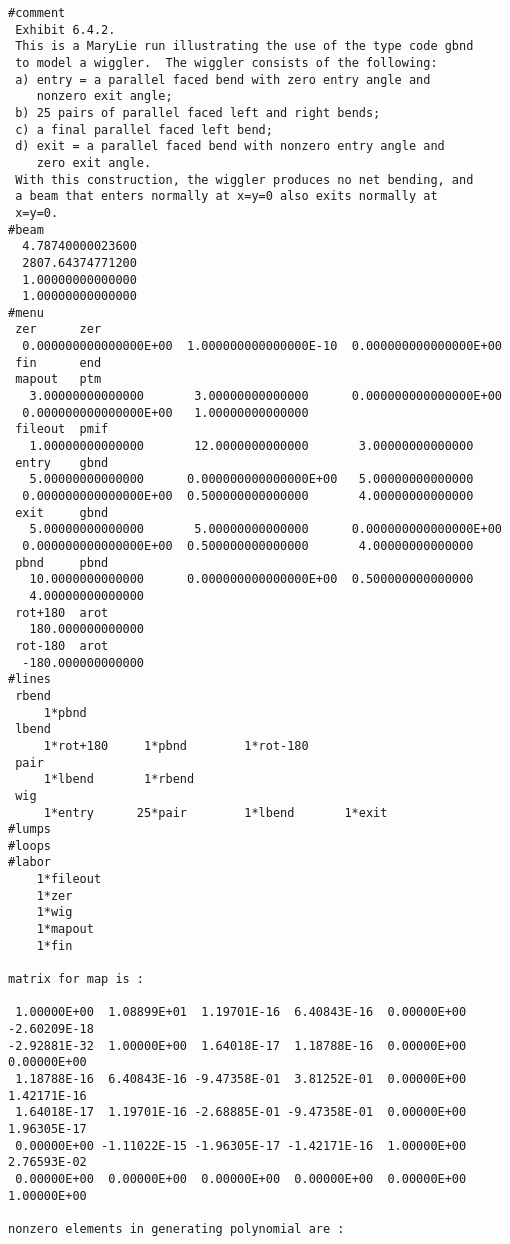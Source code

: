 \vspace{.25in}
\begin{footnotesize}
\begin{verbatim}
#comment
 Exhibit 6.4.2.
 This is a MaryLie run illustrating the use of the type code gbnd
 to model a wiggler.  The wiggler consists of the following:
 a) entry = a parallel faced bend with zero entry angle and
    nonzero exit angle;
 b) 25 pairs of parallel faced left and right bends;
 c) a final parallel faced left bend;
 d) exit = a parallel faced bend with nonzero entry angle and
    zero exit angle.
 With this construction, the wiggler produces no net bending, and
 a beam that enters normally at x=y=0 also exits normally at
 x=y=0.
#beam
  4.78740000023600
  2807.64374771200
  1.00000000000000
  1.00000000000000
#menu
 zer      zer
  0.000000000000000E+00  1.000000000000000E-10  0.000000000000000E+00
 fin      end
 mapout   ptm
   3.00000000000000       3.00000000000000      0.000000000000000E+00
  0.000000000000000E+00   1.00000000000000
 fileout  pmif
   1.00000000000000       12.0000000000000       3.00000000000000
 entry    gbnd
   5.00000000000000      0.000000000000000E+00   5.00000000000000
  0.000000000000000E+00  0.500000000000000       4.00000000000000
 exit     gbnd
   5.00000000000000       5.00000000000000      0.000000000000000E+00
  0.000000000000000E+00  0.500000000000000       4.00000000000000
 pbnd     pbnd
   10.0000000000000      0.000000000000000E+00  0.500000000000000
   4.00000000000000
 rot+180  arot
   180.000000000000
 rot-180  arot
  -180.000000000000
#lines
 rbend
     1*pbnd
 lbend
     1*rot+180     1*pbnd        1*rot-180
 pair
     1*lbend       1*rbend
 wig
     1*entry      25*pair        1*lbend       1*exit
#lumps
#loops
#labor
    1*fileout
    1*zer
    1*wig
    1*mapout
    1*fin

matrix for map is :

 1.00000E+00  1.08899E+01  1.19701E-16  6.40843E-16  0.00000E+00 -2.60209E-18
-2.92881E-32  1.00000E+00  1.64018E-17  1.18788E-16  0.00000E+00  0.00000E+00
 1.18788E-16  6.40843E-16 -9.47358E-01  3.81252E-01  0.00000E+00  1.42171E-16
 1.64018E-17  1.19701E-16 -2.68885E-01 -9.47358E-01  0.00000E+00  1.96305E-17
 0.00000E+00 -1.11022E-15 -1.96305E-17 -1.42171E-16  1.00000E+00  2.76593E-02
 0.00000E+00  0.00000E+00  0.00000E+00  0.00000E+00  0.00000E+00  1.00000E+00

nonzero elements in generating polynomial are :


\end{verbatim}
\end{footnotesize}
